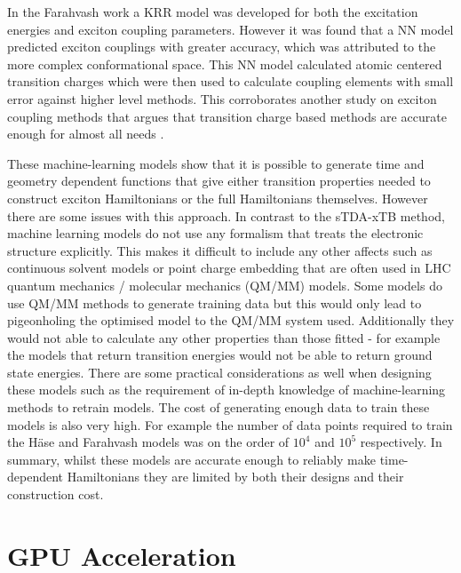 In the Farahvash work a KRR model was developed for both the excitation energies
and exciton coupling parameters. However it was found that a NN model predicted 
exciton couplings with greater accuracy, which was attributed to the more complex 
conformational space. This NN model calculated atomic centered transition charges 
which were then used to calculate coupling elements with small error against higher 
level methods. This corroborates another study on exciton coupling methods that
argues that transition charge based methods are accurate enough for almost all needs \cite{Kenny2016}.

These machine-learning models show that it is possible to generate time and geometry
dependent functions that give either transition properties needed to construct exciton
Hamiltonians or the full Hamiltonians themselves. However there are some issues 
with this approach. In contrast to the sTDA-xTB method, machine learning models 
do not use any formalism that treats the electronic structure explicitly. This makes 
it difficult to include any other affects such as continuous solvent models or point
charge embedding that are often used in LHC quantum mechanics / molecular mechanics
(QM/MM) models. Some models do use QM/MM methods to generate training data but this
would only lead to pigeonholing the optimised model to the QM/MM system used. Additionally
they would not able to calculate any other properties than those fitted - for example
the models that return \Qy transition energies would not be able to return ground
state energies. There are some practical considerations as well when designing these
models such as the requirement of in-depth knowledge of machine-learning methods 
to retrain models. The cost of generating enough data to train these models is also
very high. For example the number of data points required to train the H\"{a}se and
Farahvash models was on the order of $10^4$ and $10^5$ respectively. In summary,
whilst these models are accurate enough to reliably make time-dependent Hamiltonians 
they are limited by both their designs and their construction cost.

\section{GPU Acceleration}
\label{sec:gpu_acceleration}

